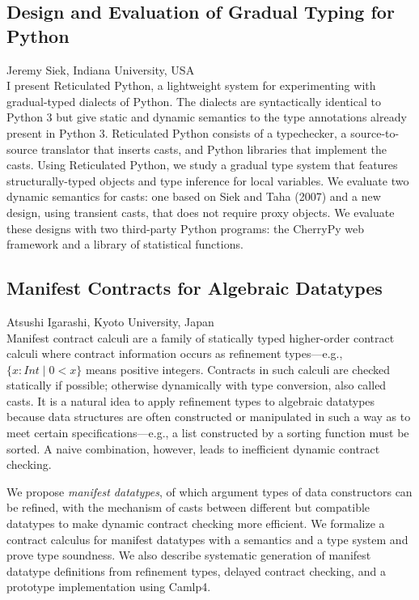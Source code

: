 \documentclass[11pt]{article}
\begin{document}
\subsection*{Design and Evaluation of Gradual Typing for Python}
\noindent Jeremy Siek, Indiana University, USA \\[0.5ex]

I present Reticulated Python, a lightweight system for experimenting
with gradual-typed dialects of Python.  The dialects are syntactically
identical to Python 3 but give static and dynamic semantics to the
type annotations already present in Python 3. Reticulated Python
consists of a typechecker, a source-to-source translator that inserts
casts, and Python libraries that implement the casts. Using
Reticulated Python, we study a gradual type system that features
structurally-typed objects and type inference for local variables. We
evaluate two dynamic semantics for casts: one based on Siek and Taha
(2007) and a new design, using transient casts, that does not require
proxy objects. We evaluate these designs with two third-party Python
programs: the CherryPy web framework and a library of statistical
functions.

\subsection*{Manifest Contracts for Algebraic Datatypes}
\noindent Atsushi Igarashi, Kyoto University, Japan \\[0.5ex]

Manifest contract calculi are a family of statically typed
higher-order contract calculi where contract information occurs as
refinement types---e.g., $\{x:Int \mid 0 < x\}$ means positive integers.
Contracts in such calculi are checked statically if possible;
otherwise dynamically with type conversion, also called casts.  It is
a natural idea to apply refinement types to algebraic datatypes
because data structures are often constructed or manipulated in such a
way as to meet certain specifications---e.g., a list constructed by a
sorting function must be sorted.  A naive combination, however, leads
to inefficient dynamic contract checking.

We propose \emph{manifest datatypes}, of which argument types of data
constructors can be refined, with the mechanism of casts between
different but compatible datatypes to make dynamic contract checking
more efficient.  We formalize a contract calculus for manifest
datatypes with a semantics and a type system and prove type soundness.
We also describe systematic generation of manifest datatype
definitions from refinement types, delayed contract checking, and a
prototype implementation using Camlp4.
\end{document}
